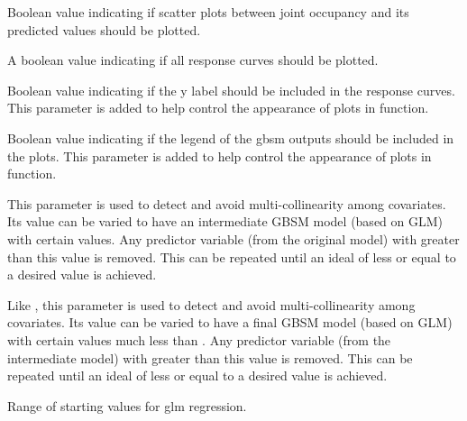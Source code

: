 \documentclass[a4paper]{book}
\begin{document}
\begin{Arguments}
\begin{ldescription}
\item[\code{scat.plot}] Boolean value indicating if scatter plots between joint occupancy and its predicted
values should be plotted.

\item[\code{response.curves}] A boolean value indicating if all response curves should be plotted.

\item[\code{ylabel}] Boolean value indicating if the y label should be included in the response curves. This
parameter is added to help control the appearance of plots in  function.

\item[\code{leg}] Boolean value indicating if the legend of the gbsm outputs should be included in the plots. This
parameter is added to help control the appearance of plots in  function.

\item[\code{max.vif}] This parameter is used to detect and avoid multi-collinearity among covariates. Its value can be varied
to have an intermediate GBSM model (based on GLM) with  certain  values. Any predictor variable (from the
original model) with  greater than this value is removed. This can be repeated until an ideal  of
less or equal to a desired value is achieved.

\item[\code{max.vif2}] Like , this parameter is used to detect and avoid multi-collinearity among covariates.
Its value can be varied to have a final GBSM model (based on GLM) with certain  values much less than .
Any predictor variable (from the intermediate model) with  greater than this value is removed. This
can be repeated until an ideal  of less or equal to a desired value is achieved.

\item[\code{start.range}] Range of starting values for glm regression.
\end{ldescription}
\end{Arguments}
%
\end{document}
